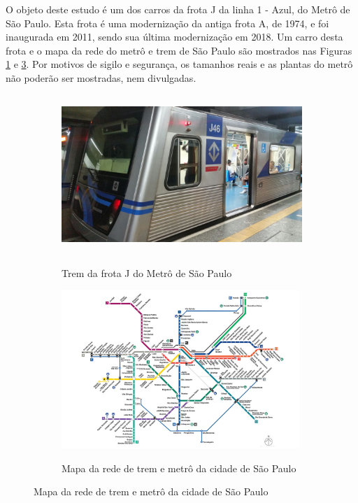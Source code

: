 \documentclass[acronym,symbols]{fei}
\begin{document}
O objeto deste estudo é um dos carros da frota J da linha 1 - Azul, do Metrô de São Paulo. Esta frota é uma modernização da antiga frota A, de 1974, e foi inaugurada em 2011, sendo sua última modernização em 2018. Um carro desta frota e o mapa da rede do metrô e trem de São Paulo são mostrados nas Figuras \ref{fig:Trem_da_Frota_J_J46} e \ref{fig:mapa-da-rede-metro-0124-abre}. Por motivos de sigilo e segurança, os tamanhos reais e as plantas do metrô não poderão ser mostradas, nem divulgadas.

\begin{figure}[!htp]
\begin{subfigure}{0.5\textwidth}
    \caption{Trem da frota J do Metrô de São Paulo}
    \includegraphics[width=0.9\linewidth, height=6cm]{Imagens/Trem_da_Frota_J_J46} 
    \label{fig:Trem_da_Frota_J_J46}
\end{subfigure}
\begin{subfigure}{0.5\textwidth}
    \caption{Mapa da rede de trem e metrô da cidade de São Paulo}
    \includegraphics[width=0.9\linewidth, height=6cm]{Imagens/mapa-da-rede-metro-0124-abre.jpg}
    \label{fig:mapa-da-rede-metro-0124-abre}
\end{subfigure}
\end{figure}
\end{document}
